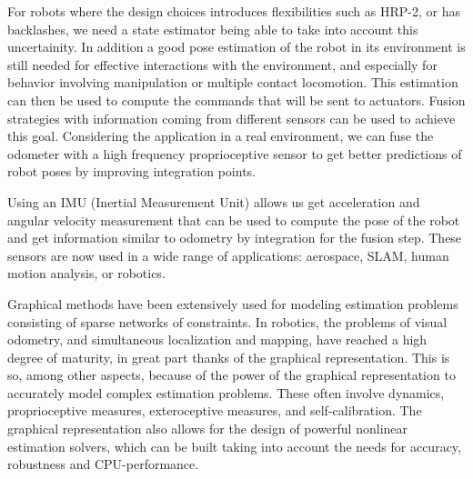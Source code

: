 For robots where the design choices introduces flexibilities such as HRP-2, or has backlashes,
we need a state estimator being able to take into account this uncertainity.
In addition a good pose estimation of the robot in its environment is still needed for effective interactions with the environment,
and especially for behavior involving manipulation or multiple contact locomotion.
This estimation can then be used to compute the commands that will be sent to actuators.
Fusion strategies with information coming from different sensors can be used to achieve this goal. 
Considering the application in a real environment, we can fuse the odometer with a high frequency proprioceptive sensor 
to get better predictions of robot poses by improving integration points.

Using an IMU (Inertial Measurement Unit) allows us get acceleration and angular velocity measurement that can be used to 
compute the pose of the robot and get information similar to odometry by integration for the fusion step.
These sensors are now used in a wide range of applications: aerospace, SLAM, human motion analysis, or robotics.





Graphical methods have been extensively used for modeling estimation problems consisting of sparse networks of constraints. 
In robotics, the problems of visual odometry, and simultaneous localization and mapping, have reached a high degree of maturity, in great part thanks of the graphical representation. 
This is so, among other aspects, because of the power of the graphical representation to accurately model complex estimation problems. 
These often involve dynamics, proprioceptive measures, exteroceptive measures, and self-calibration. 
The graphical representation also allows for the design of powerful nonlinear estimation solvers, which can be built taking into account the needs for accuracy, robustness and CPU-performance.
